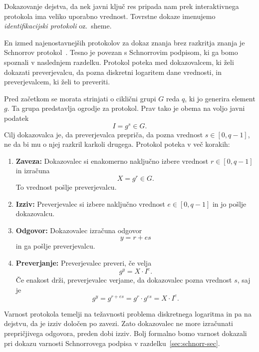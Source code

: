 \documentclass[isrm2, tisk]{fmfdelo}
\begin{document}
Dokazovanje dejstva, da nek javni ključ res pripada nam prek interaktivnega protokola ima veliko
uporabno vrednost. Tovrstne dokaze imenujemo \textit{identifikacijski protokoli} oz.\ sheme.

\begin{primer}
    En izmed najenostavnejših protokolov za dokaz znanja brez razkritja znanja je Schnorrov
    protokol~\cite{schnorr1989sig}. Tesno je povezan s Schnorrovim podpisom, ki ga bomo spoznali v
    naslednjem razdelku. Protokol poteka med dokazovalcem, ki želi dokazati preverjevalcu, da
    pozna diskretni logaritem dane vrednosti, in preverjevalcem, ki želi to preveriti.

    Pred začetkom se morata strinjati o ciklični grupi $G$ reda $q$, ki jo generira element $g$. Ta
    grupa predstavlja ogrodje za protokol. Prav tako je obema na voljo javni podatek
    $$
    I = g^s \in G.
    $$
    Cilj dokazovalca je, da preverjevalca prepriča, da pozna vrednost $s \in [0, q-1]$, ne da bi mu
    o njej razkril karkoli drugega. Protokol poteka v več korakih:
    \begin{enumerate}
        \item \textbf{Zaveza:}
            Dokazovalec si enakomerno naključno izbere vrednost $r \in [0, q-1]$ in izračuna
            $$
            X = g^r \in G.
            $$
            To vrednost pošlje preverjevalcu.
        \item \textbf{Izziv:}
            Preverjevalec si izbere naključno vrednost $e \in [0, q-1]$ in jo pošlje dokazovalcu.
        \item \textbf{Odgovor:}
            Dokazovalec izračuna odgovor
            $$
            y = r + es
            $$
            in ga pošlje preverjevalcu.
        \item \textbf{Preverjanje:}
            Preverjevalec preveri, če velja
            $$
            g^y = X \cdot I^e.
            $$
            Če enakost drži, preverjevalec verjame, da dokazovalec pozna vrednost $s$, saj je
            $$
            g^y = g^{r + es} = g^r \cdot g^{es} = X \cdot I^e.
            $$
    \end{enumerate}
    Varnost protokola temelji na težavnosti problema diskretnega logaritma in pa na dejstvu, da je
    izziv določen po zavezi. Zato dokazovalec ne more izračunati prepričjivega odgovora, preden
    dobi izziv. Bolj formalno bomo varnost dokazali pri dokazu varnosti Schnorrovega podpisa v
    razdelku~\ref{sec:schnorr-sec}.
\end{primer}
\end{document}
